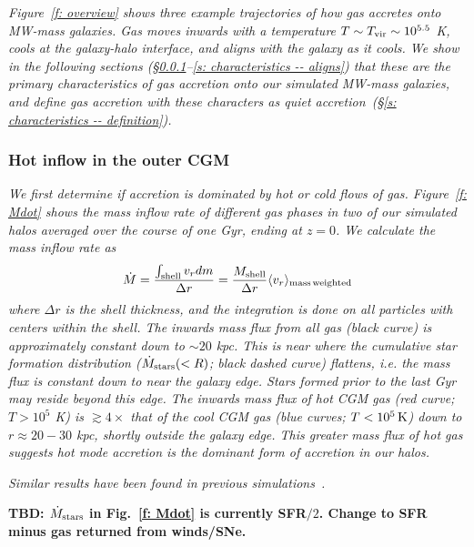 \documentclass[fleqn,usenatbib]{mnras}
\newcommand{\Mdot}{\dot{M}}
\begin{document}
\textit{
Figure~\ref{f: overview} shows three example trajectories of how gas accretes onto MW-mass galaxies.
Gas moves inwards with a temperature $T \sim T_{\rm vir} \sim 10^{5.5}$ K, cools at the galaxy-halo interface, and aligns with the galaxy as it cools.
We show in the following sections (\S\ref{s: characteristics -- inflowing gas phase}--\ref{s: characteristics -- aligns}) that these are the primary characteristics of gas accretion onto our simulated MW-mass galaxies, and define gas accretion with these characters as \textit{quiet accretion}~(\S\ref{s: characteristics -- definition}).
}

\subsubsection{Hot inflow in the outer CGM}
\label{s: characteristics -- inflowing gas phase}

\textit{
We first determine if accretion is dominated by hot or cold flows of gas.
Figure~\ref{f: Mdot} shows the mass inflow rate of different gas phases in two of our simulated halos averaged over the course of one Gyr, ending at $z=0$.
We calculate the mass inflow rate as
\begin{equation}
     \Mdot = \frac{\int_{\rm shell} v_r dm}{\Delta r} = \frac{M_{\rm shell}}{\Delta r} \langle v_r\rangle_{\rm mass\, weighted}
     \label{e: Mdot}
\end{equation}
where $\Delta r$ is the shell thickness, and the integration is done on all particles with centers within the shell.
The inwards mass flux from all gas (black curve) is approximately constant down to $\sim 20$ kpc.
This is near where the cumulative star formation distribution ($\dot M_{\rm stars}(<R)$; black dashed curve) flattens, i.e. the mass flux is constant down to near the galaxy edge.
Stars formed prior to the last Gyr may reside beyond this edge.
The inwards mass flux of hot CGM gas (red curve; $T>10^5$ K)  is $\gtrsim 4\times$ that of the cool CGM gas (blue curves; $T < 10^5\,{\rm K}$) down to $r \approx 20-30$ kpc, shortly outside the galaxy edge.
This greater mass flux of hot gas suggests hot mode accretion is the dominant form of accretion in our halos.
}

\textit{
Similar results have been found in previous simulations~\citep[e.g.][]{joung2012a}.
}

\textbf{TBD: $\dot{M}_{\rm stars}$ in Fig.~\ref{f: Mdot} is currently SFR$/2$. Change to SFR minus gas returned from winds/SNe.}
\end{document}
